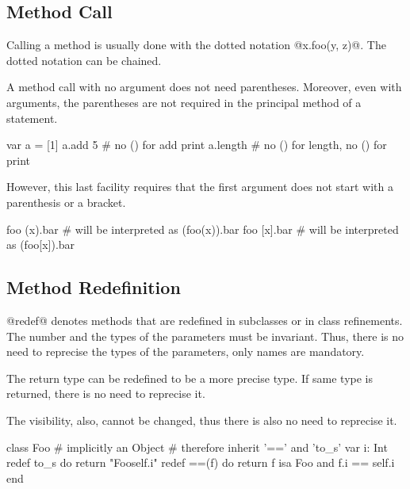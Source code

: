 \subsection{Method Call}\label{call}

Calling a method is usually done with the dotted notation @x.foo(y, z)@.
The dotted notation can be chained.

A method call with no argument does not need parentheses.
Moreover, even with arguments, the parentheses are not required in the principal method of a statement.
\begin{lst}
var a = [1]
a.add 5 # no () for add
print a.length # no () for length, no () for print
\end{lst}

However, this last facility requires that the first argument does not start with a parenthesis or a bracket.
\begin{lst}
foo (x).bar # will be interpreted as (foo(x)).bar
foo [x].bar # will be interpreted as (foo[x]).bar
\end{lst}

\subsection{Method Redefinition}\label{redef}

@redef@ denotes methods that are redefined in subclasses or in class refinements.
The number and the types of the parameters must be invariant.
Thus, there is no need to reprecise the types of the parameters, only names are mandatory.

The return type can be redefined to be a more precise type.
If same type is returned, there is no need to reprecise it.

The visibility, also, cannot be changed, thus there is also no need to reprecise it.

\begin{lst}
class Foo
	# implicitly an Object
	# therefore inherit '==' and 'to_s' 
	var i: Int
	redef to_s do return "Foo{self.i}"
	redef ==(f) do return f isa Foo and f.i == self.i
end
\end{lst}

